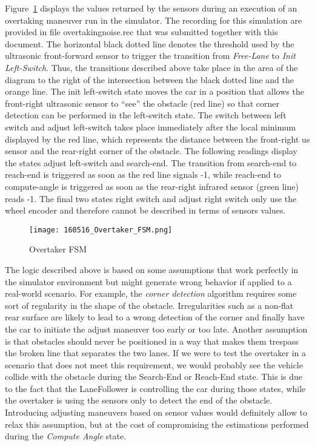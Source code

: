 \noindent
Figure~\ref{otfsmb} displays the values returned by the sensors during an
execution of an overtaking maneuver run in the simulator. The recording for this
simulation are provided in file overtaking\textunderscore noise.rec that was
submitted together with this document. The horizontal black dotted line denotes
the threshold used by the ultrasonic front-forward sensor to trigger the
transition from \textit{Free-Lane} to \textit{Init Left-Switch}. Thus, the
transitions described above take place in the area of the diagram to the right
of the intersection between the black dotted line and the orange line. The init
left-switch state moves the car in a position that allows the front-right
ultrasonic sensor to ``see'' the obstacle (red line) so that corner detection
can be performed in the left-switch state. The switch between left switch and
adjust left-switch takes place immediately after the local minimum displayed by
the red line, which represents the distance between the front-right us sensor
and the rear-right corner of the obstacle. The following readings display the
states adjust left-switch and search-end. The transition from search-end to
reach-end is triggered as soon as the red line signals -1, while reach-end to
compute-angle is triggered as soon as the rear-right infrared sensor (green
line) reads -1. The final two states right switch and adjust right switch only
use the wheel encoder and therefore cannot be described in terms of sensors
values.
\begin{figure}[ht]
  \centering
  \texttt{[image: 160516\_Overtaker\_FSM.png]}
  \caption{Overtaker FSM}
  \label{otfsmb}
\end{figure}
The logic described above is based on some assumptions that work perfectly in
the simulator environment but might generate wrong behavior if applied to a
real-world scenario. For example, the \textit{corner detection} algorithm
requires some sort of regularity in the shape of the obstacle. Irregularities
such as a non-flat rear surface are likely to lead to a wrong detection of the
corner and finally have the car to initiate the adjust maneuver too early or too
late. Another assumption is that obstacles should never be positioned in a way
that makes them trespass the broken line that separates the two lanes. If we
were to test the overtaker in a scenario that does not meet this requirement, we
would probably see the vehicle collide with the obstacle during the Search-End
or Reach-End state. This is due to the fact that the LaneFollower is controlling
the car during those states, while the overtaker is using the sensors only to
detect the end of the obstacle. Introducing adjusting maneuvers based on sensor
values would definitely allow to relax this assumption, but at the cost of
compromising the estimations performed during the \textit{Compute Angle} state.

